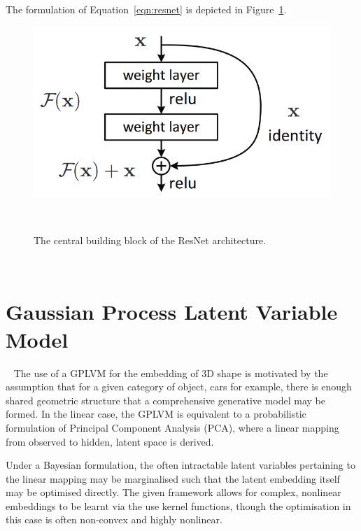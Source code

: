 The formulation of Equation~\ref{eqn:resnet} is depicted in Figure~\ref{figure:resnet_block}.
\begin{figure}[!htbp]
  \centering
  \includegraphics[width=.6\linewidth]{figures/spp/residual_block_he.png}
  \caption[ResNet Block]{The central building block of the ResNet architecture.\footnotemark}
~\label{figure:resnet_block}
\end{figure}
~

\section{Gaussian Process Latent Variable Model}
~\label{sec:spp_gplvm}
The use of a GPLVM for the embedding of 3D shape is motivated by the assumption that for a 
given category of object, cars for example, there is enough shared geometric structure that 
a comprehensive generative model may be formed. In the linear case, the GPLVM is equivalent 
to a probabilistic formulation of Principal Component Analysis (PCA), where a linear mapping 
from observed to hidden, latent space is derived. 

Under a Bayesian formulation, the often intractable latent variables pertaining to the linear 
mapping may be marginalised such that the latent embedding itself may be optimised directly. The 
given framework allows for complex, nonlinear embeddings to be learnt via the use kernel functions, 
though the optimisation in this case is often non-convex and highly nonlinear.

